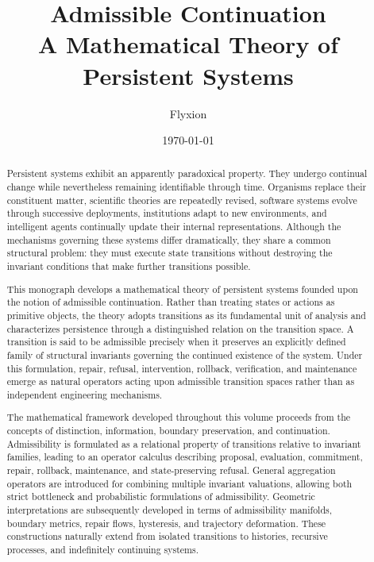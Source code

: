 \documentclass[11pt]{book}
\title{\Huge Admissible Continuation\\[1em]
\Large A Mathematical Theory of Persistent Systems}
\author{Flyxion}
\date{\today}
\numberwithin{equation}{chapter}
\theoremstyle{definition}
\theoremstyle{plain}
\begin{document}
\frontmatter

\maketitle

\begin{abstract}

Persistent systems exhibit an apparently paradoxical property. They undergo continual change while nevertheless remaining identifiable through time. Organisms replace their constituent matter, scientific theories are repeatedly revised, software systems evolve through successive deployments, institutions adapt to new environments, and intelligent agents continually update their internal representations. Although the mechanisms governing these systems differ dramatically, they share a common structural problem: they must execute state transitions without destroying the invariant conditions that make further transitions possible.

This monograph develops a mathematical theory of persistent systems founded upon the notion of admissible continuation. Rather than treating states or actions as primitive objects, the theory adopts transitions as its fundamental unit of analysis and characterizes persistence through a distinguished relation on the transition space. A transition is said to be admissible precisely when it preserves an explicitly defined family of structural invariants governing the continued existence of the system. Under this formulation, repair, refusal, intervention, rollback, verification, and maintenance emerge as natural operators acting upon admissible transition spaces rather than as independent engineering mechanisms.

The mathematical framework developed throughout this volume proceeds from the concepts of distinction, information, boundary preservation, and continuation. Admissibility is formulated as a relational property of transitions relative to invariant families, leading to an operator calculus describing proposal, evaluation, commitment, repair, rollback, maintenance, and state-preserving refusal. General aggregation operators are introduced for combining multiple invariant valuations, allowing both strict bottleneck and probabilistic formulations of admissibility. Geometric interpretations are subsequently developed in terms of admissibility manifolds, boundary metrics, repair flows, hysteresis, and trajectory deformation. These constructions naturally extend from isolated transitions to histories, recursive processes, and indefinitely continuing systems.


\end{abstract}
\end{document}

